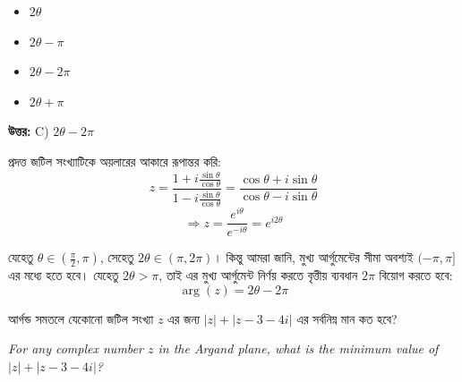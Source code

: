 \documentclass[12pt, a4paper]{article}
\begin{document}
\begin{itemize}[label={}, leftmargin=1cm, itemsep=0.5em]
    \item[\textbf{A)}] $2\theta$
    \item[\textbf{B)}] $2\theta - \pi$
    \item[\textbf{C)}] $2\theta - 2\pi$
    \item[\textbf{D)}] $2\theta + \pi$
\end{itemize}

\vspace{0.5em}
\begin{tcolorbox}[answerbox]
    \textbf{\color{success} উত্তর:} C) $2\theta - 2\pi$
\end{tcolorbox}
\vspace{1em}

\begin{tcolorbox}[solutionbox={সমাধান (Solution)}]
    \noindent
    প্রদত্ত জটিল সংখ্যাটিকে অয়লারের আকারে রূপান্তর করি:
    \[ z = \frac{1 + i\frac{\sin\theta}{\cos\theta}}{1 - i\frac{\sin\theta}{\cos\theta}} = \frac{\cos\theta + i\sin\theta}{\cos\theta - i\sin\theta} \]
    \[ \Rightarrow z = \frac{e^{i\theta}}{e^{-i\theta}} = e^{i 2\theta} \]
    
    \vspace{0.5em}
    যেহেতু $\theta \in \left(\frac{\pi}{2}, \pi\right)$, সেহেতু $2\theta \in (\pi, 2\pi)$। কিন্তু আমরা জানি, মুখ্য আর্গুমেন্টের সীমা অবশ্যই $(-\pi, \pi]$ এর মধ্যে হতে হবে। যেহেতু $2\theta > \pi$, তাই এর মুখ্য আর্গুমেন্ট নির্ণয় করতে বৃত্তীয় ব্যবধান $2\pi$ বিয়োগ করতে হবে:
    \[ \arg(z) = 2\theta - 2\pi \]
\end{tcolorbox}
\vspace{1em}

\begin{tcolorbox}[questionbox={প্রশ্ন (Question) 22}]
    \noindent
    আর্গন্ড সমতলে যেকোনো জটিল সংখ্যা $z$ এর জন্য $|z| + |z - 3 - 4i|$ এর সর্বনিম্ন মান কত হবে?
    
    \vspace{0.8em}
    \begin{english}
    \noindent\textit{\color{darkgray}
    For any complex number $z$ in the Argand plane, what is the minimum value of $|z| + |z - 3 - 4i|$?
    }
    \end{english}
\end{tcolorbox}
\end{document}

